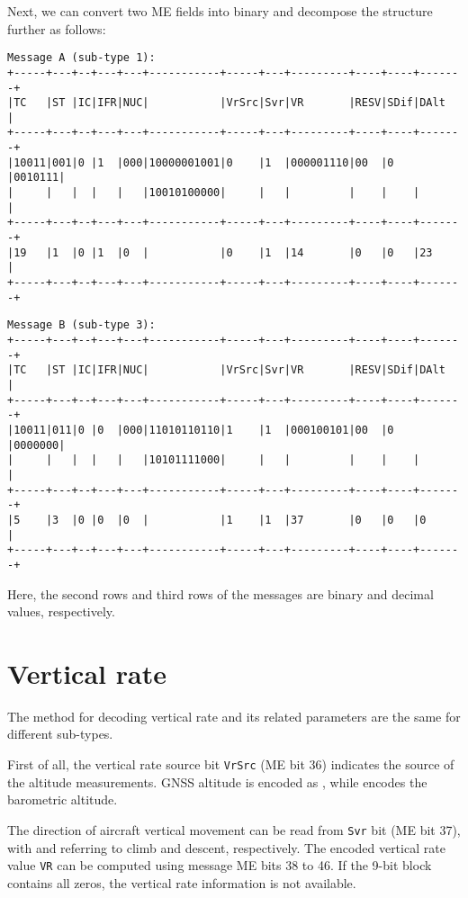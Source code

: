 Next, we can convert two ME fields into binary and decompose the structure further as follows:

\begin{verbatim}
Message A (sub-type 1):
+-----+---+--+---+---+-----------+-----+---+---------+----+----+-------+
|TC   |ST |IC|IFR|NUC|           |VrSrc|Svr|VR       |RESV|SDif|DAlt   |
+-----+---+--+---+---+-----------+-----+---+---------+----+----+-------+
|10011|001|0 |1  |000|10000001001|0    |1  |000001110|00  |0   |0010111|
|     |   |  |   |   |10010100000|     |   |         |    |    |       |
+-----+---+--+---+---+-----------+-----+---+---------+----+----+-------+
|19   |1  |0 |1  |0  |           |0    |1  |14       |0   |0   |23     |
+-----+---+--+---+---+-----------+-----+---+---------+----+----+-------+
\end{verbatim}

\begin{verbatim}
Message B (sub-type 3):
+-----+---+--+---+---+-----------+-----+---+---------+----+----+-------+
|TC   |ST |IC|IFR|NUC|           |VrSrc|Svr|VR       |RESV|SDif|DAlt   |
+-----+---+--+---+---+-----------+-----+---+---------+----+----+-------+
|10011|011|0 |0  |000|11010110110|1    |1  |000100101|00  |0   |0000000|
|     |   |  |   |   |10101111000|     |   |         |    |    |       | 
+-----+---+--+---+---+-----------+-----+---+---------+----+----+-------+
|5    |3  |0 |0  |0  |           |1    |1  |37       |0   |0   |0      |
+-----+---+--+---+---+-----------+-----+---+---------+----+----+-------+
\end{verbatim}

Here, the second rows and third rows of the messages are binary and decimal values, respectively.


\section{Vertical rate}

The method for decoding vertical rate and its related parameters are the same for different sub-types.

First of all, the vertical rate source bit \texttt{VrSrc} (ME bit 36) indicates the source of the altitude measurements. GNSS altitude is encoded as \0, while \1 encodes the barometric altitude.

The direction of aircraft vertical movement can be read from \texttt{Svr} bit (ME bit 37), with \0 and \1 referring to climb and descent, respectively. The encoded vertical rate value \texttt{VR} can be computed using message ME bits 38 to 46. If the 9-bit block contains all zeros, the vertical rate information is not available.

